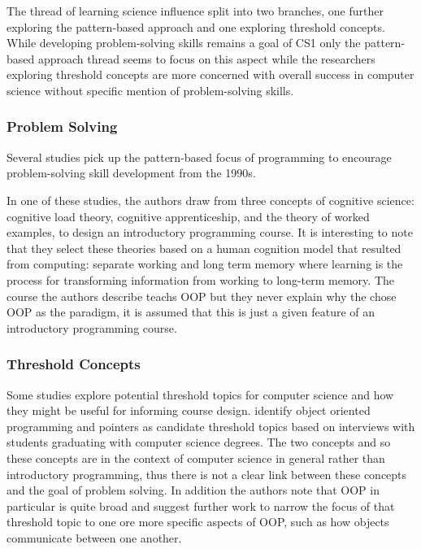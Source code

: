 \documentclass[12pt]{article}
\begin{document}
The thread of learning science influence split into two branches, one
further exploring the pattern-based approach and one exploring
threshold concepts. While developing problem-solving skills remains a
goal of CS1 only the pattern-based approach thread seems to focus on
this aspect while the researchers exploring threshold concepts are
more concerned with overall success in computer science without
specific mention of problem-solving skills.

\subsubsection{Problem Solving}

Several studies pick up the pattern-based focus of programming to
encourage problem-solving skill development from the
1990s\autocite{muller_almost_2004,muller_pattern_2005,muller_patternoriented_2007,caspersen_instructional_2007-1}.

In one of these studies, the authors draw from three concepts of
cognitive science: cognitive load theory, cognitive apprenticeship,
and the theory of worked examples, to design an introductory
programming course\autocite{caspersen_instructional_2007-1}. It is
interesting to note that they select these theories based on a human
cognition model that resulted from computing: separate working and
long term memory where learning is the process for transforming
information from working to long-term memory. The course the authors
describe teachs OOP but they never explain why the chose OOP as the
paradigm, it is assumed that this is just a given feature of an
introductory programming course.


\subsubsection{Threshold Concepts}

Some studies explore potential threshold
topics\autocite{meyer_threshold_2005} for computer science and how
they might be useful for informing course
design\autocite{mccartney_liminal_2009,boustedt_threshold_2007}. \citeauthor{boustedt_threshold_2007}
identify object oriented programming and pointers as candidate
threshold topics based on interviews with students graduating with
computer science degrees. The two concepts and so these concepts are
in the context of computer science in general rather than introductory
programming, thus there is not a clear link between these concepts and
the goal of problem solving. In addition the authors note that OOP in
particular is quite broad and suggest further work to narrow the focus
of that threshold topic to one ore more specific aspects of OOP, such
as how objects communicate between one another.
\end{document}
